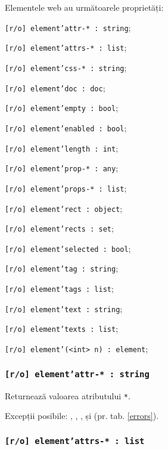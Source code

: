 Elementele web au următoarele proprietăți:
\begin{icItems}
\item \texttt{[r/o] element'attr-* : string};
\item \texttt{[r/o] element'attrs-* : list};
\item \texttt{[r/o] element'css-* : string};
\item \texttt{[r/o] element'doc : doc};
\item \texttt{[r/o] element'empty : bool};
\item \texttt{[r/o] element'enabled : bool};
\item \texttt{[r/o] element'length : int};
\item \texttt{[r/o] element'prop-* : any};
\item \texttt{[r/o] element'props-* : list};
\item \texttt{[r/o] element'rect : object};
\item \texttt{[r/o] element'rects : set};
\item \texttt{[r/o] element'selected : bool};
\item \texttt{[r/o] element'tag : string};
\item \texttt{[r/o] element'tags : list};
\item \texttt{[r/o] element'text : string};
\item \texttt{[r/o] element'texts : list};
\item \texttt{[r/o] element'(<int> n) : element};
\end{icItems} 

\subsubsection{\texttt{[r/o] element'attr-* : string}}

Returnează valoarea atributului \texttt{*}.

Excepții posibile: , , ,  și  (pr. tab. \ref{errors}).

\subsubsection{\texttt{[r/o] element'attrs-* : list}}

